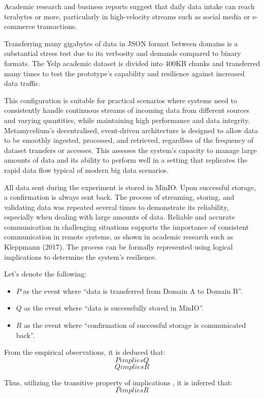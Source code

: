 \documentclass[journal]{IEEEtran}
\begin{document}
Academic research and business reports suggest that daily data intake can reach terabytes or more, particularly in high-velocity streams such as social media or e-commerce transactions. 

Transferring many gigabytes of data in JSON format between domains is a substantial stress test due to its verbosity and demands compared to binary formats. The Yelp academic dataset is divided into 400KB chunks and transferred many times to test the prototype's capability and resilience against increased data traffic. 

This configuration is suitable for practical scenarios where systems need to consistently handle continuous streams of incoming data from different sources and varying quantities, while maintaining high performance and data integrity. Metamycelium's decentralised, event-driven architecture is designed to allow data to be smoothly ingested, processed, and retrieved, regardless of the frequency of dataset transfers or accesses. This assesses the system's capacity to manage large amounts of data and its ability to perform well in a setting that replicates the rapid data flow typical of modern big data scenarios.


All data sent during the experiment is stored in MinIO. Upon successful storage, a confirmation is always sent back. The process of streaming, storing, and validating data was repeated several times to demonstrate its reliability, especially when dealing with large amounts of data. Reliable and accurate communication in challenging situations supports the importance of consistent communication in remote systems, as shown in academic research such as Kleppmann (2017). The process can be formally represented using logical implications to determine the system's resilience.

Let's denote the following:
\begin{itemize}
    \item \( P \) as the event where ``data is transferred from Domain A to Domain B''.
    \item \( Q \) as the event where ``data is successfully stored in MinIO''.
    \item \( R \) as the event where ``confirmation of successful storage is communicated back''.
\end{itemize}

From the empirical observations, it is deduced that:
\[ P  implies  Q \]
\[ Q  implies  R \]

Thus, utilizing the transitive property of implications \cite{johnson2019logic}, it is inferred that:
\[ P  implies  R \]
\end{document}
